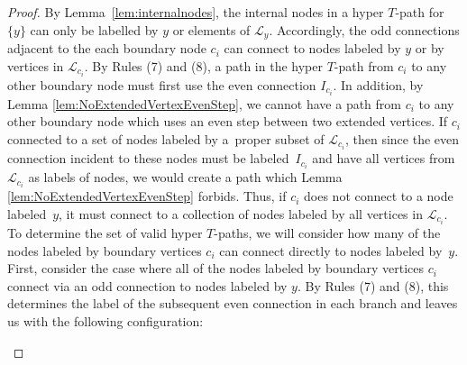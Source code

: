 \documentclass[pdftex]{sigma}
\numberwithin{equation}{section}
\begin{document}
\begin{proof}
By Lemma~\ref{lem:internalnodes}, the internal nodes in a hyper $T$-path for $\{y\}$ can only be labelled by $y$ or elements of $\mathcal{L}_y$. Accordingly, the odd connections adjacent to the each boundary node $c_i$ can connect to nodes labeled by $y$ or by vertices in $\mathcal{L}_{c_i}$. By Rules (7) and (8), a path in the hyper $T$-path from $c_i$ to any other boundary node must first use the even connection $I_{c_i}$. In addition, by Lemma \ref{lem:NoExtendedVertexEvenStep}, we cannot have a path from $c_i$ to any other boundary node which uses an even step between two extended vertices. If $c_i$ connected to a set of nodes labeled by a~proper subset of $\mathcal{L}_{c_i}$, then since the even connection incident to these nodes must be labeled~$I_{c_i}$ and have all vertices from $\mathcal{L}_{c_i}$ as labels of nodes, we would create a path which Lemma \ref{lem:NoExtendedVertexEvenStep} forbids. Thus, if $c_i$ does not connect to a node labeled~$y$, it must connect to a collection of nodes labeled by all vertices in $\mathcal{L}_{c_i}$. To determine the set of valid hyper $T$-paths, we will consider how many of the nodes labeled by boundary vertices $c_i$ can connect directly to nodes labeled by~$y$.
First, consider the case where all of the nodes labeled by boundary vertices $c_i$ connect via an odd connection to nodes labeled by $y$. By Rules (7) and (8), this determines the label of the subsequent even connection in each branch and leaves us with the following configuration:
\begin{center}
\end{center}
\end{proof}
\end{document}
